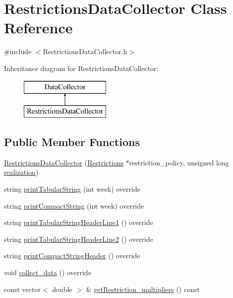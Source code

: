 \hypertarget{classRestrictionsDataCollector}{}\section{Restrictions\+Data\+Collector Class Reference}
\label{classRestrictionsDataCollector}


{\ttfamily \#include $<$Restrictions\+Data\+Collector.\+h$>$}

Inheritance diagram for Restrictions\+Data\+Collector\+:\begin{figure}[H]
\begin{center}
\leavevmode
\includegraphics[height=2.000000cm]{classRestrictionsDataCollector}
\end{center}
\end{figure}
\subsection*{Public Member Functions}
\begin{DoxyCompactItemize}
\item 
\mbox{\hyperlink{classRestrictionsDataCollector_a0e700f013442a6df86fe75bcee4c31df}{Restrictions\+Data\+Collector}} (\mbox{\hyperlink{classRestrictions}{Restrictions}} $\ast$restriction\+\_\+policy, unsigned long \mbox{\hyperlink{classDataCollector_a9ef2887466fe3123aa19ef956a219b96}{realization}})
\item 
string \mbox{\hyperlink{classRestrictionsDataCollector_a45e5612e70ec98430e31271f68ca407e}{print\+Tabular\+String}} (int week) override
\item 
string \mbox{\hyperlink{classRestrictionsDataCollector_ab8b8c30dca6b2e41c1ef5e3ac7e29813}{print\+Compact\+String}} (int week) override
\item 
string \mbox{\hyperlink{classRestrictionsDataCollector_a2676a6693b254997d223fc1c437258ab}{print\+Tabular\+String\+Header\+Line1}} () override
\item 
string \mbox{\hyperlink{classRestrictionsDataCollector_afb3c49c2c9b152bb2372e2fcc198e1b8}{print\+Tabular\+String\+Header\+Line2}} () override
\item 
string \mbox{\hyperlink{classRestrictionsDataCollector_ad36ff12a666d72c92893c918715628f6}{print\+Compact\+String\+Header}} () override
\item 
void \mbox{\hyperlink{classRestrictionsDataCollector_a7d8b6433ec25a53ed50577c2cf89912d}{collect\+\_\+data}} () override
\item 
const vector$<$ double $>$ \& \mbox{\hyperlink{classRestrictionsDataCollector_ac3f378d63c09a7c72d883db64ab610c9}{get\+Restriction\+\_\+multipliers}} () const
\end{DoxyCompactItemize}
